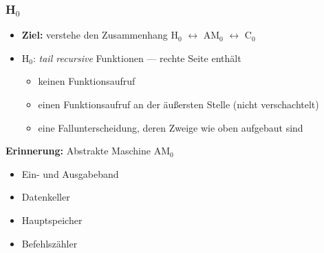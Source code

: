 \documentclass{beamer}
\begin{document}
\begin{frame} \frametitle{H${}_\text{0}$}
	\footnotesize
	\begin{itemize}
		\item \textbf{Ziel:} verstehe den Zusammenhang H${}_\text{0}$ $\leftrightarrow$ AM${}_\text{0}$ \textcolor{cdgray}{$\leftrightarrow$ C${}_\text{0}$}
		\item H${}_\text{0}$: \textit{tail recursive} Funktionen --- rechte Seite enthält
		\begin{itemize} \footnotesize
			\item keinen Funktionsaufruf
			\item einen Funktionsaufruf an der äußersten Stelle (nicht verschachtelt)
			\item eine Fallunterscheidung, deren Zweige wie oben aufgebaut sind
		\end{itemize}
	\end{itemize}

	\textbf{Erinnerung:} Abstrakte Maschine AM${}_0$
	\begin{itemize}
		\item Ein- und Ausgabeband
		\item Datenkeller
		\item Hauptspeicher 
		\item Befehlszähler
	\end{itemize}
\end{frame}
\end{document}
